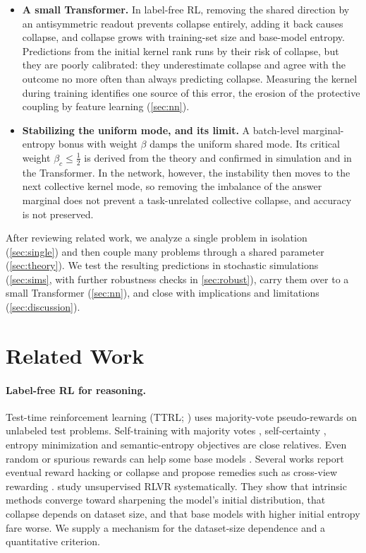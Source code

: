 \begin{itemize}
\item \textbf{A small Transformer.} In label-free RL, removing the shared direction by an antisymmetric readout prevents collapse entirely, adding it back causes collapse, and collapse grows with training-set size and base-model entropy. Predictions from the initial kernel rank runs by their risk of collapse, but they are poorly calibrated: they underestimate collapse and agree with the outcome no more often than always predicting collapse. Measuring the kernel during training identifies one source of this error, the erosion of the protective coupling by feature learning (\cref{sec:nn}).
\item \textbf{Stabilizing the uniform mode, and its limit.} A batch-level marginal-entropy bonus with weight $\beta$ damps the uniform shared mode. Its critical weight $\beta_c\le\tfrac12$ is derived from the theory and confirmed in simulation and in the Transformer. In the network, however, the instability then moves to the next collective kernel mode, so removing the imbalance of the answer marginal does not prevent a task-unrelated collective collapse, and accuracy is not preserved.
\end{itemize}
After reviewing related work, we analyze a single problem in isolation (\cref{sec:single}) and then couple many problems through a shared parameter (\cref{sec:theory}).
We test the resulting predictions in stochastic simulations (\cref{sec:sims}, with further robustness checks in \cref{sec:robust}), carry them over to a small Transformer (\cref{sec:nn}), and close with implications and limitations (\cref{sec:discussion}).

\section{Related Work}
\label{sec:related}

\paragraph{Label-free RL for reasoning.}
Test-time reinforcement learning (TTRL; \citealp{ttrl}) uses majority-vote pseudo-rewards on unlabeled test problems.
Self-training with majority votes \citep{shafayat2025srt}, self-certainty \citep{intuitor}, entropy minimization \citep{agarwal2025entmin,rent} and semantic-entropy objectives \citep{empo} are close relatives. Even random or spurious rewards can help some base models \citep{spurious}.
Several works report eventual reward hacking or collapse and propose remedies such as cross-view rewarding \citep{corewarding}.
\citet{he2026urlvr} study unsupervised RLVR systematically. They show that intrinsic methods converge toward sharpening the model's initial distribution, that collapse depends on dataset size, and that base models with higher initial entropy fare worse.
We supply a mechanism for the dataset-size dependence and a quantitative criterion.


